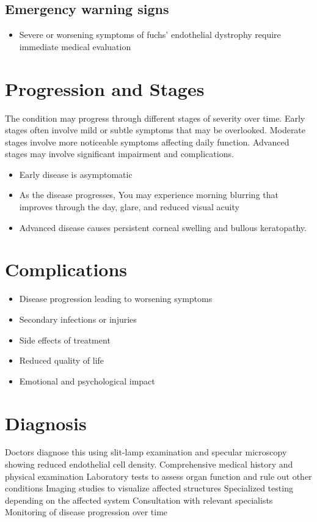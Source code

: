 \subsection{Emergency warning signs}
\begin{itemize}[noitemsep]
  \item Severe or worsening symptoms of fuchs' endothelial dystrophy require immediate medical evaluation
\end{itemize}
\section{Progression and Stages}
The condition may progress through different stages of severity over time. Early stages often involve mild or subtle symptoms that may be overlooked. Moderate stages involve more noticeable symptoms affecting daily function. Advanced stages may involve significant impairment and complications.

\begin{itemize}[noitemsep]
  \item Early disease is asymptomatic
  \item As the disease progresses, You may experience morning blurring that improves through the day, glare, and reduced visual acuity
  \item Advanced disease causes persistent corneal swelling and bullous keratopathy.
\end{itemize}
\section{Complications}
\begin{itemize}[noitemsep]
  \item Disease progression leading to worsening symptoms
  \item Secondary infections or injuries
  \item Side effects of treatment
  \item Reduced quality of life
  \item Emotional and psychological impact
\end{itemize}
\section{Diagnosis}
Doctors diagnose this using slit-lamp examination and specular microscopy showing reduced endothelial cell density. Comprehensive medical history and physical examination Laboratory tests to assess organ function and rule out other conditions Imaging studies to visualize affected structures Specialized testing depending on the affected system Consultation with relevant specialists Monitoring of disease progression over time

